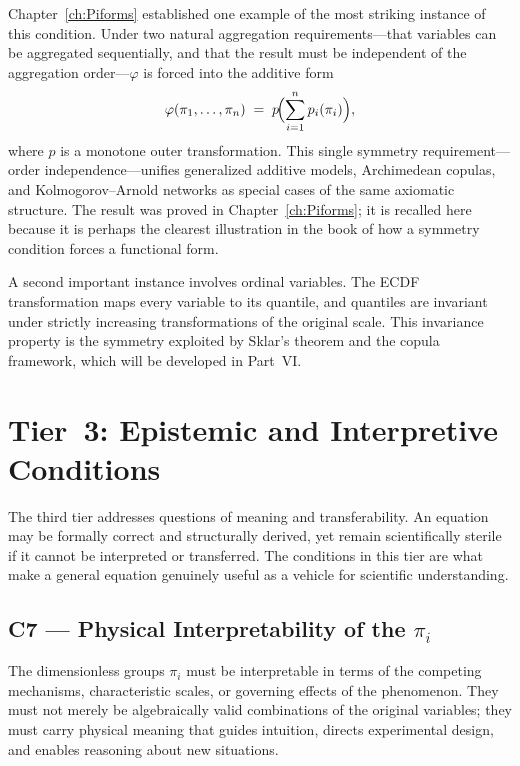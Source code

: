 Chapter~\ref{ch:Piforms} established one example of the most striking instance of
this condition.  Under two natural aggregation requirements---that
variables can be aggregated sequentially, and that the result must
be independent of the aggregation order---$\varphi$ is forced into
the additive form
\begin{equation}
  \varphi(\pi_1,\ldots,\pi_n)
  \;=\; p\!\Bigl(\sum_{i=1}^n p_i(\pi_i)\Bigr),
  \label{eq:ucq:additive}
\end{equation}
where $p$ is a monotone outer transformation.
This single symmetry requirement---order independence---unifies
generalized additive models, Archimedean copulas, and
Kolmogorov--Arnold networks as special cases of the same axiomatic
structure.  The result was proved in Chapter~\ref{ch:Piforms}; it
is recalled here because it is perhaps the clearest illustration
in the book of how a symmetry condition forces a functional form.

A second important instance involves ordinal variables.  The ECDF
transformation maps every variable to its quantile, and quantiles
are invariant under strictly increasing transformations of the
original scale.  This invariance property is the symmetry
exploited by Sklar's theorem and the copula framework, which will
be developed in Part~VI.

\section{Tier~3: Epistemic and Interpretive Conditions}
\label{sec:ucq:tier3}

The third tier addresses questions of meaning and transferability.
An equation may be formally correct and structurally derived, yet
remain scientifically sterile if it cannot be interpreted or
transferred.  The conditions in this tier are what make a general
equation genuinely useful as a vehicle for scientific
understanding.

\subsection{C7 --- Physical Interpretability of the $\pi_i$}

\begin{condbox}
\begin{condition}
  \label{cond:ucq:interp_pi}
The dimensionless groups $\pi_i$ must be interpretable in terms of
the competing mechanisms, characteristic scales, or governing
effects of the phenomenon.  They must not merely be algebraically
valid combinations of the original variables; they must carry
physical meaning that guides intuition, directs experimental
design, and enables reasoning about new situations.
\end{condition}
\end{condbox}

